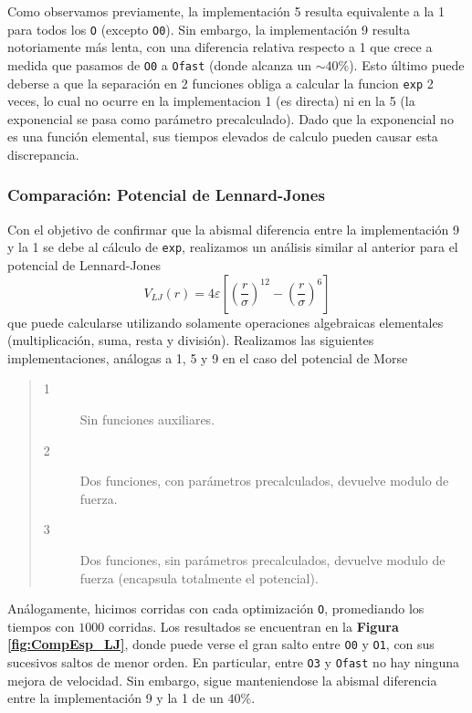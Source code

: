 Como observamos previamente, la implementación 5 resulta equivalente a la 1 para todos los \texttt{O} (excepto \texttt{O0}). 
Sin embargo, la implementación 9 resulta notoriamente más lenta, con una diferencia relativa respecto a 1 que crece a medida que pasamos de \texttt{O0} a \texttt{Ofast} (donde alcanza un $\sim40\%$). 
Esto último puede deberse a que la separación en 2 funciones obliga a calcular la funcion \texttt{exp} 2  veces, lo cual no ocurre en la implementacion 1 (es directa) ni en la 5 (la exponencial se
pasa como parámetro precalculado). 
Dado que la exponencial no es una función elemental, sus tiempos elevados de calculo pueden causar esta discrepancia.

\subsubsection{Comparación: Potencial de Lennard-Jones}

Con el objetivo de confirmar que la abismal diferencia entre la implementación 9 y la 1 se debe al cálculo de \texttt{exp}, realizamos un análisis similar al anterior para el potencial de Lennard-Jones 
\[ V_{LJ} (r) =  4\varepsilon \left[ \left(\frac{r}{\sigma}\right)^{12} -\left(\frac{r}{\sigma}\right)^{6} \right] \]
que puede calcularse utilizando solamente operaciones algebraicas elementales (multiplicación, suma, resta y división). 
Realizamos las siguientes implementaciones, análogas a 1, 5 y 9 en el caso del potencial de Morse
	
\begin{quote}
\begin{description}
\item[1] Sin funciones auxiliares.
\item[2] Dos funciones, con parámetros precalculados, devuelve modulo de fuerza.
\item[3] Dos funciones, sin parámetros precalculados, devuelve modulo de fuerza (encapsula totalmente el potencial).
\end{description}
\end{quote}

Análogamente, hicimos corridas con cada optimización \texttt{O}, promediando los tiempos con $1000$ corridas. 
Los resultados se encuentran en la \textbf{Figura \ref{fig:CompEsp_LJ}}, donde puede verse el gran salto entre \texttt{O0} y \texttt{O1}, con sus sucesivos saltos de menor orden. 
En particular, entre \texttt{O3} y \texttt{Ofast} no hay ninguna mejora de velocidad. 
Sin embargo, sigue manteniendose la abismal diferencia entre la implementación 9 y la 1 de un $40\%$.

